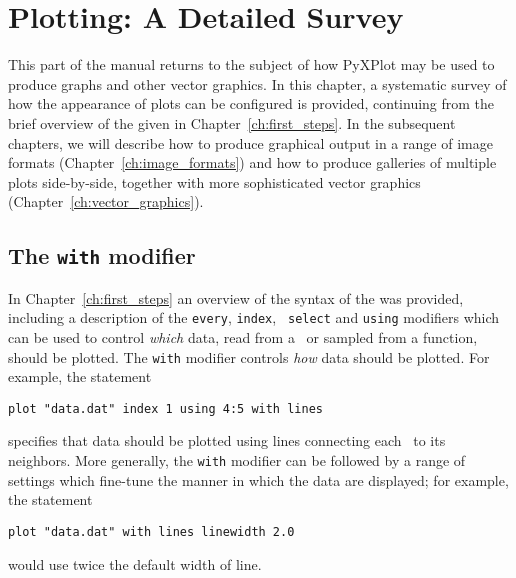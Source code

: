 %
%
%
%
%



\chapter{Plotting: A Detailed Survey}
\label{ch:plotting}

This part of the manual returns to the subject of how PyXPlot may be used to
produce graphs and other vector graphics. In this chapter, a systematic survey
of how the appearance of plots can be configured is provided, continuing from
the brief overview of the  given in Chapter~\ref{ch:first_steps}.
In the subsequent chapters, we will describe how to produce graphical output in
a range of image formats (Chapter~\ref{ch:image_formats}) and how to produce
galleries of multiple plots side-by-side, together with more sophisticated
vector graphics (Chapter~\ref{ch:vector_graphics}).

\section{The {\tt with} modifier}
\label{sec:with_modifier}

In Chapter~\ref{ch:first_steps} an overview of the syntax of the 
was provided, including a description of the {\tt every}, {\tt index}, {\tt
select} and {\tt using} modifiers which can be used to control {\it which}
data, read from a \datafile\ or sampled from a function, should be plotted. The
{\tt with} modifier controls {\it how} data should be plotted. For example, the
statement
\begin{verbatim}
plot "data.dat" index 1 using 4:5 with lines
\end{verbatim}
specifies that data should be plotted using lines connecting each \datapoint\ to
its neighbors. More generally, the {\tt with} modifier can be followed by a
range of settings which fine-tune the manner in which the data are displayed;
for example, the statement
\begin{verbatim}
plot "data.dat" with lines linewidth 2.0
\end{verbatim}
would use twice the default width of line.


